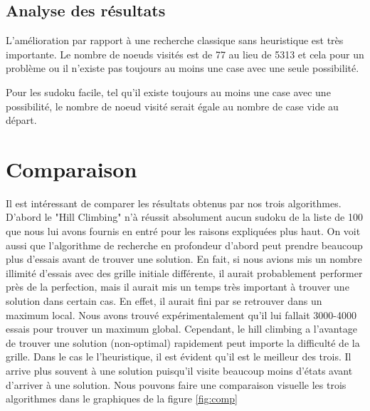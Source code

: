 \documentclass[a4paper,10pt]{article}
\begin{document}
\subsection{Analyse des résultats}

L'amélioration par rapport à une recherche classique sans heuristique est très importante. Le nombre de noeuds visités est de 77 au lieu de 5313 et cela pour un problème ou il n'existe pas toujours au moins une case avec une seule possibilité.

Pour les sudoku facile, tel qu'il existe toujours au moins une case avec une possibilité, le nombre de noeud visité serait égale au nombre de case vide au départ.


\section{Comparaison}
Il est intéressant de comparer les résultats obtenus par nos trois algorithmes. D'abord le "Hill Climbing" n'à réussit absolument aucun sudoku de la liste de 100 que nous lui avons fournis en entré pour les raisons expliquées plus haut. On voit aussi que l'algorithme de recherche en profondeur d'abord peut prendre beaucoup plus d'essais avant de trouver une solution. En fait, si nous avions mis un nombre illimité d'essais avec des grille initiale différente, il aurait probablement performer près de la perfection, mais il aurait mis un temps très important à trouver une solution dans certain cas. En effet, il aurait fini par se retrouver dans un maximum local. Nous avons trouvé expérimentalement qu'il lui fallait 3000-4000 essais pour trouver un maximum global. Cependant, le hill climbing a l'avantage de trouver une solution (non-optimal) rapidement peut importe la difficulté de la grille.
 Dans le cas le l'heuristique, il est évident qu'il est le meilleur des trois. Il arrive plus souvent à une solution puisqu'il visite beaucoup moins d'états avant d'arriver à une solution. Nous pouvons faire une comparaison visuelle les trois algorithmes dans le graphiques de la figure \ref{fig:comp} \\
\end{document}
